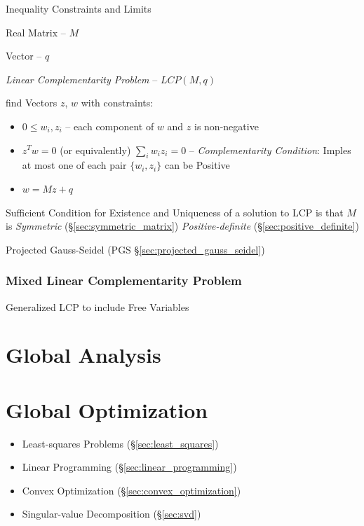 Inequality Constraints and Limits %

Real Matrix -- $M$

Vector -- $q$

\emph{Linear Complementarity Problem} -- $LCP(M,q)$

find Vectors $z$, $w$ with constraints:

\begin{itemize}
  \item $0 \leq w_i,z_i$ -- each component of $w$ and $z$ is
    non-negative
  \item $z^T w = 0$ (or equivalently) $\sum_i w_i z_i = 0$ --
    \emph{Complementarity Condition}: Imples at most one of each pair
    $\{w_i,z_i\}$ can be Positive
  \item $w = M z + q$
\end{itemize}

Sufficient Condition for Existence and Uniqueness of a solution to LCP
is that $M$ is \emph{Symmetric} (\S\ref{sec:symmetric_matrix})
\emph{Positive-definite} (\S\ref{sec:positive_definite})

\fist Projected Gauss-Seidel (PGS \S\ref{sec:projected_gauss_seidel})



\subsubsection{Mixed Linear Complementarity Problem}\label{sec:mlcp}

Generalized LCP to include Free Variables



\section{Global Analysis}\label{sec:global_analysis}

\section{Global Optimization}\label{sec:global_optimization}

\begin{itemize}
  \item Least-squares Problems (\S\ref{sec:least_squares})
  \item Linear Programming (\S\ref{sec:linear_programming})
  \item Convex Optimization (\S\ref{sec:convex_optimization})
  \item Singular-value Decomposition (\S\ref{sec:svd})
\end{itemize}



